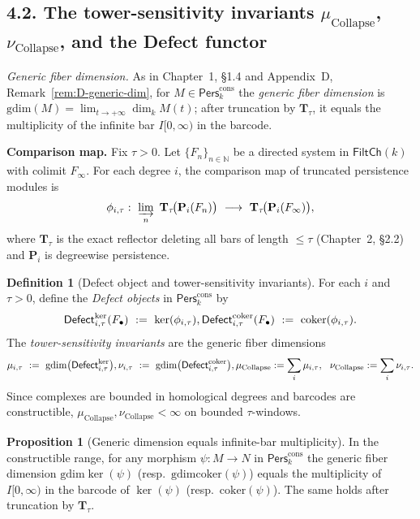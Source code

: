 \documentclass[11pt]{article}
\numberwithin{equation}{section}
\theoremstyle{plain}
\theoremstyle{definition}
\theoremstyle{remark}
\newcommand{\Pers}{\mathsf{Pers}}
\theoremstyle{plain}
\theoremstyle{definition}
\numberwithin{equation}{section}
\newtheorem{proposition}[theorem]{Proposition}
\theoremstyle{definition}
\newtheorem{definition}[theorem]{Definition}
\DeclareRobustCommand{\muc}{\mu_{\mathrm{Collapse}}}
\DeclareRobustCommand{\nuc}{\nu_{\mathrm{Collapse}}}
\numberwithin{equation}{section}
\theoremstyle{plain}
\theoremstyle{definition}
\theoremstyle{remark}
\DeclareMathOperator{\coker}{coker} %
\providecommand{\Defect}{\mathsf{Defect}}
\providecommand{\muc}{\mu_{\mathrm{Collapse}}}
\providecommand{\nuc}{\nu_{\mathrm{Collapse}}}
\providecommand{\n}{\unskip\space}
\begin{document}
\subsection*{4.2. The tower-sensitivity invariants \texorpdfstring{$\mu_{\mathrm{Collapse}}$}{mu\_Collapse}, \texorpdfstring{$\nu_{\mathrm{Collapse}}$}{nu\_Collapse}, and the Defect functor}
\emph{Generic fiber dimension.} As in Chapter~1, §1.4 and Appendix~D, Remark~\ref{rem:D-generic-dim}, for $M\in\Pers^{\mathrm{cons}}_k$ the \emph{generic fiber dimension} is $\mathrm{gdim}(M)=\lim_{t\to+\infty}\dim_k M(t)$; after truncation by $\mathbf{T}_\tau$, it equals the multiplicity of the infinite bar $I[0,\infty)$ in the barcode.

\medskip
\noindent\textbf{Comparison map.}
Fix $\tau>0$. Let $\{F_n\}_{n\in\mathbb{N}}$ be a directed system in $\mathsf{FiltCh}(k)$ with colimit $F_\infty$. For each degree $i$, the comparison map of truncated persistence modules is
\[
\phi_{i,\tau}:\ \varinjlim_{n}\ \mathbf{T}_\tau\!\big(\mathbf{P}_i(F_n)\big)\ \longrightarrow\ \mathbf{T}_\tau\!\big(\mathbf{P}_i(F_\infty)\big),
\]
where $\mathbf{T}_\tau$ is the exact reflector deleting all bars of length $\le\tau$ (Chapter~2, §2.2) and $\mathbf{P}_i$ is degreewise persistence.

\begin{definition}[Defect object and tower-sensitivity invariants]\label{def:defect}
For each $i$ and $\tau>0$, define the \emph{Defect objects} in $\Pers^{\mathrm{cons}}_k$ by
\[
\Defect_{i,\tau}^{\ker}(F_\bullet)\ :=\ \ker(\phi_{i,\tau}),\qquad \n\Defect_{i,\tau}^{\coker}(F_\bullet)\ :=\ \mathrm{coker}(\phi_{i,\tau}).
\]
The \emph{tower-sensitivity invariants} are the generic fiber dimensions
\[
\mu_{i,\tau}\ :=\ \mathrm{gdim}\big(\Defect_{i,\tau}^{\ker}\big),\qquad \n\nu_{i,\tau}\ :=\ \mathrm{gdim}\big(\Defect_{i,\tau}^{\coker}\big),\qquad \n\muc:=\sum_i \mu_{i,\tau},\ \ \nuc:=\sum_i \nu_{i,\tau}.
\]
Since complexes are bounded in homological degrees and barcodes are constructible, $\muc,\nuc<\infty$ on bounded $\tau$-windows.
\end{definition}

\begin{proposition}[Generic dimension equals infinite-bar multiplicity]\label{prop:generic-dimension-barcode}
In the constructible range, for any morphism $\psi:M\to N$ in $\Pers^{\mathrm{cons}}_k$ the generic fiber dimension
$\mathrm{gdim}\ker(\psi)$ (resp.\ $\mathrm{gdim}\mathrm{coker}(\psi)$) equals the multiplicity of $I[0,\infty)$ in the barcode of $\ker(\psi)$ (resp.\ $\mathrm{coker}(\psi)$). The same holds after truncation by $\mathbf{T}_\tau$.
\end{proposition}
\end{document}
